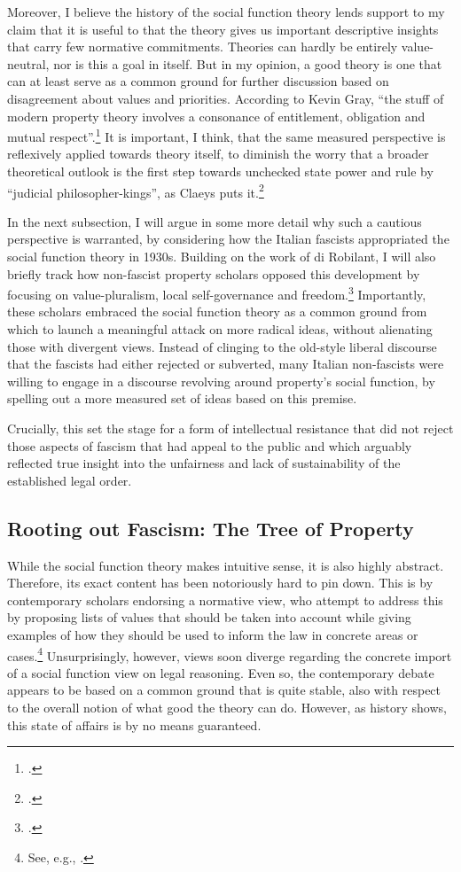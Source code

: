 Moreover, I believe the history of the social function theory lends support to my claim that it is useful to  that the theory gives us important descriptive insights that carry few normative commitments. Theories can hardly be entirely value-neutral, nor is this a goal in itself. But in my opinion, a good theory is one that can at least serve as a common ground for further discussion based on disagreement about values and priorities. According to Kevin Gray, ``the stuff of modern property theory involves a consonance of entitlement, obligation and mutual respect''.\footcite[37]{gray11} It is important, I think, that the same measured perspective is reflexively applied towards theory itself, to diminish the worry that a broader theoretical outlook is the first step towards unchecked state power and rule by ``judicial philosopher-kings'', as Claeys puts it.\footcite[944]{claeys09}

In the next subsection, I will argue in some more detail why such a cautious perspective is warranted, by considering how the Italian fascists appropriated the social function theory in 1930s. Building on the work of di Robilant, I will also briefly track how non-fascist property scholars opposed this development by focusing on value-pluralism, local self-governance and freedom.\footcite{robilant13} Importantly, these scholars embraced the social function theory as a common ground from which to launch a meaningful attack on more radical ideas, without alienating those with divergent views. Instead of clinging to the old-style liberal discourse that the fascists had either rejected or subverted, many Italian non-fascists were willing to engage in a discourse revolving around property's social function, by spelling out a more measured set of ideas based on this premise. 

Crucially, this set the stage for a form of intellectual resistance that did not reject those aspects of fascism that had appeal to the public and which arguably reflected true insight into the unfairness and lack of sustainability of the established legal order.

\subsection{Rooting out Fascism: {T}he Tree of Property}

While the social function theory makes intuitive sense, it is also highly abstract. Therefore, its exact content has been notoriously hard to pin down. This is  by contemporary scholars endorsing a normative view, who attempt to address this by proposing lists of values that should be taken into account while giving examples of how they should be used to inform the law in concrete areas or cases.\footnote{See, e.g., \cite{alexander14,alexander11,dagan07}.} Unsurprisingly, however, views soon diverge regarding the concrete import of a social function view on legal reasoning. Even so, the contemporary debate appears to be based on a common ground that is quite stable, also with respect to the overall notion of what good the theory can do. However, as history shows, this state of affairs is by no means guaranteed.

